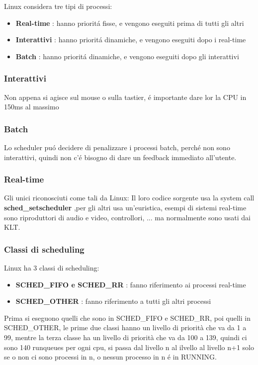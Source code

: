     Linux considera tre tipi di processi:
    \begin{itemize}
        \item \textbf{Real-time} : hanno prioritá fisse, e vengono eseguiti prima di tutti gli altri
        \item \textbf{Interattivi} : hanno prioritá dinamiche, e vengono eseguiti dopo i real-time
        \item \textbf{Batch} : hanno prioritá dinamiche, e vengono eseguiti dopo gli interattivi
        \end{itemize}
    \subsubsection*{Interattivi}
    Non appena si agisce sul mouse o sulla tastier, é importante dare lor la CPU in 150ms al massimo
    \subsubsection*{Batch}
    Lo scheduler puó decidere di penalizzare i processi batch, perché non sono interattivi, quindi non c'é bisogno di dare
    un feedback immediato all'utente.
    \subsubsection*{Real-time}
    Gli unici riconosciuti come tali da Linux: Il loro codice sorgente usa la system call \textbf{sched\_setscheduler}
    ,per gli altri usa un'euristica, esempi di sistemi real-time sono riproduttori di audio e video, controllori, ... ma normalmente
    sono usati dai KLT.
    \subsubsection*{Classi di scheduling}
    Linux ha 3 classi di scheduling:
    \begin{itemize}
        \item \textbf{SCHED\_FIFO e SCHED\_RR } : fanno riferimento ai processi real-time
        \item \textbf{SCHED\_OTHER} : fanno riferimento a tutti gli altri processi
    \end{itemize}
    Prima si eseguono quelli che sono in SCHED\_FIFO e SCHED\_RR, poi quelli in SCHED\_OTHER, le prime due classi hanno
    un livello di priorità che va da 1 a 99, mentre la terza classe ha un livello di priorità che va da 100 a 139,
    quindi ci sono 140 runqueues per ogni cpu, si passa dal livello n al ilvello al livello n+1 solo se o non ci sono processi in n,
    o nessun processo in n é in RUNNING.\\

